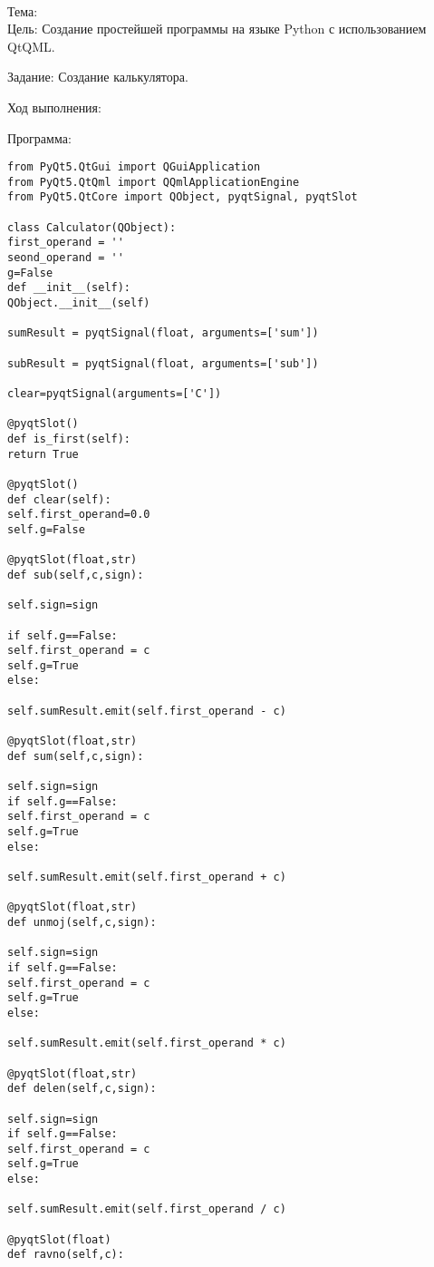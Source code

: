 \begin{center}
{\WorkType}
\\
Тема: {\Topic}
\\
Цель: Создание простейшей программы на языке Python с использованием QtQML. 
\end{center}
Задание:
Создание калькулятора.

Ход выполнения:
\begin{center}
Программа:
\end{center}
\begingroup
\fontsize{12pt}{12pt}\selectfont
\begin{verbatim}
from PyQt5.QtGui import QGuiApplication
from PyQt5.QtQml import QQmlApplicationEngine
from PyQt5.QtCore import QObject, pyqtSignal, pyqtSlot

class Calculator(QObject):
first_operand = ''
seond_operand = ''
g=False
def __init__(self):
QObject.__init__(self)

sumResult = pyqtSignal(float, arguments=['sum'])

subResult = pyqtSignal(float, arguments=['sub'])

clear=pyqtSignal(arguments=['C'])

@pyqtSlot()
def is_first(self):
return True

@pyqtSlot()
def clear(self):
self.first_operand=0.0 
self.g=False

@pyqtSlot(float,str)
def sub(self,c,sign):

self.sign=sign

if self.g==False:
self.first_operand = c
self.g=True
else:

self.sumResult.emit(self.first_operand - c)

@pyqtSlot(float,str)
def sum(self,c,sign):

self.sign=sign
if self.g==False:
self.first_operand = c
self.g=True
else:

self.sumResult.emit(self.first_operand + c)

@pyqtSlot(float,str)
def unmoj(self,c,sign):

self.sign=sign
if self.g==False:
self.first_operand = c
self.g=True
else:

self.sumResult.emit(self.first_operand * c)

@pyqtSlot(float,str)
def delen(self,c,sign):

self.sign=sign
if self.g==False:
self.first_operand = c
self.g=True
else:

self.sumResult.emit(self.first_operand / c)

@pyqtSlot(float)
def ravno(self,c):


\end{verbatim}
